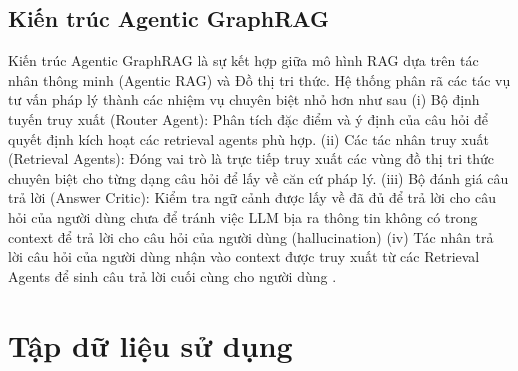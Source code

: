 \documentclass[../DoAn.tex]{subfiles}
\begin{document}
\subsection{Kiến trúc Agentic GraphRAG}
\label{subsection:3.1.2}


Kiến trúc Agentic GraphRAG là sự kết hợp giữa mô hình RAG dựa trên tác nhân thông minh (Agentic RAG) và Đồ thị tri thức. Hệ thống phân rã các tác vụ tư vấn pháp lý thành các nhiệm vụ chuyên biệt nhỏ hơn như sau (i) Bộ định tuyến truy xuất (Router Agent): Phân tích đặc điểm và ý định của câu hỏi để quyết định kích hoạt các retrieval agents phù hợp. (ii) Các tác nhân truy xuất (Retrieval Agents): Đóng vai trò là trực tiếp truy xuất các vùng đồ thị tri thức chuyên biệt cho từng dạng câu hỏi để lấy về căn cứ pháp lý. (iii) Bộ đánh giá câu trả lời (Answer Critic): Kiểm tra ngữ cảnh được lấy về đã đủ để trả lời cho câu hỏi của người dùng chưa để tránh việc LLM bịa ra thông tin không có trong context để trả lời cho câu hỏi của người dùng (hallucination) (iv) Tác nhân trả lời câu hỏi của người dùng nhận vào context được truy xuất từ các Retrieval Agents để sinh câu trả lời cuối cùng cho người dùng \cite{bratanic2025essential}.


\section{Tập dữ liệu sử dụng}
\label{section:3.2-dataset}
\end{document}
